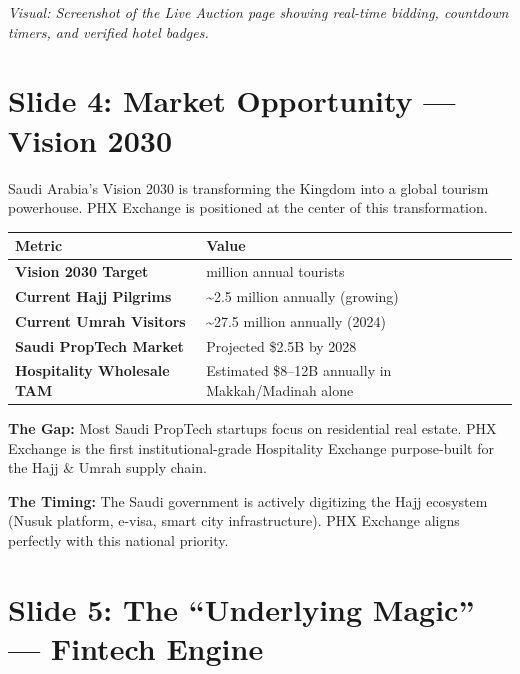 \documentclass[11pt,a4paper]{article}
\begin{document}
\textit{Visual: Screenshot of the Live Auction page showing real-time bidding, countdown timers, and verified hotel badges.}

\newpage

\section*{Slide 4: Market Opportunity --- Vision 2030}

Saudi Arabia's Vision 2030 is transforming the Kingdom into a global tourism powerhouse. PHX Exchange is positioned at the center of this transformation.

\vspace{0.5cm}

\begin{center}
\begin{tabular}{|>{\raggedright\arraybackslash}p{5cm}|>{\raggedright\arraybackslash}p{9cm}|}
\hline
\rowcolor{headergray}
\textbf{Metric} & \textbf{Value} \\
\hline
\textbf{Vision 2030 Target} & 150 million annual tourists \\
\hline
\textbf{Current Hajj Pilgrims} & \textasciitilde{}2.5 million annually (growing) \\
\hline
\textbf{Current Umrah Visitors} & \textasciitilde{}27.5 million annually (2024) \\
\hline
\textbf{Saudi PropTech Market} & Projected \$2.5B by 2028 \\
\hline
\textbf{Hospitality Wholesale TAM} & Estimated \$8--12B annually in Makkah/Madinah alone \\
\hline
\end{tabular}
\end{center}

\vspace{0.5cm}

\textbf{The Gap:} Most Saudi PropTech startups focus on residential real estate. PHX Exchange is the first institutional-grade Hospitality Exchange purpose-built for the Hajj \& Umrah supply chain.

\vspace{0.3cm}

\textbf{The Timing:} The Saudi government is actively digitizing the Hajj ecosystem (Nusuk platform, e-visa, smart city infrastructure). PHX Exchange aligns perfectly with this national priority.

\newpage

\section*{Slide 5: The ``Underlying Magic'' --- Fintech Engine}
\end{document}
